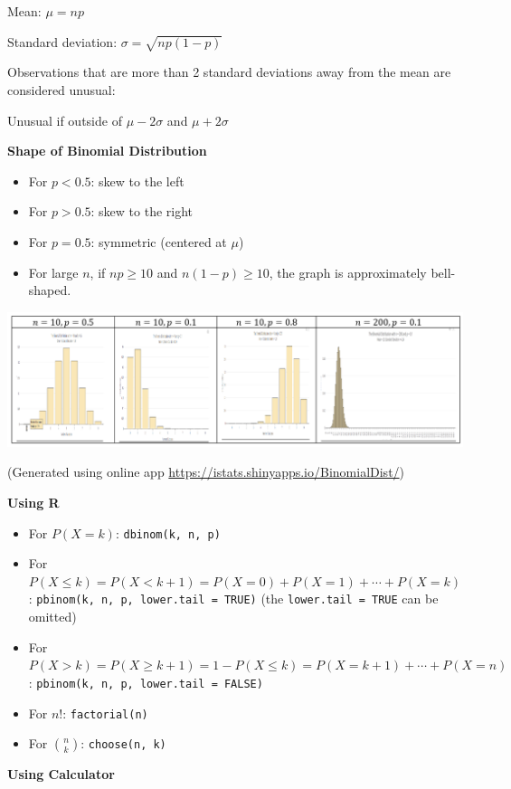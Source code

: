 \documentclass[
]{book}
\providecommand{\tightlist}{%
  \setlength{\itemsep}{0pt}\setlength{\parskip}{0pt}}
\begin{document}
Mean: \(\mu = np\)

Standard deviation: \(\sigma = \sqrt{np(1-p)}\)

Observations that are more than 2 standard deviations away from the mean are considered unusual:

Unusual if outside of \(\mu - 2\sigma\) and \(\mu + 2\sigma\)

\textbf{Shape of Binomial Distribution}

\begin{itemize}
\tightlist
\item
  For \(p < 0.5\): skew to the left
\item
  For \(p > 0.5\): skew to the right
\item
  For \(p = 0.5\): symmetric (centered at \(\mu\))
\item
  For large \(n\), if \(np \geq 10\) and \(n(1-p) \geq 10\), the graph is approximately bell-shaped.
\end{itemize}

\includegraphics[width=5.72917in,height=\textheight]{images/img41.png}

(Generated using online app \url{https://istats.shinyapps.io/BinomialDist/})

\textbf{Using R}

\begin{itemize}
\item
  For \(P(X = k)\): \texttt{dbinom(k,\ n,\ p)}
\item
  For \(P(X \leq k) = P(X < k+1) = P(X = 0) + P(X = 1) + \cdots + P(X = k)\): \texttt{pbinom(k,\ n,\ p,\ lower.tail\ =\ TRUE)} (the \texttt{lower.tail\ =\ TRUE} can be omitted)
\item
  For \(P(X > k) = P(X \geq k+1) = 1 - P(X \leq k) = P(X = k+1) + \cdots + P(X = n)\): \texttt{pbinom(k,\ n,\ p,\ lower.tail\ =\ FALSE)}
\item
  For \(n!\): \texttt{factorial(n)}
\item
  For \(\binom{n}{k}\): \texttt{choose(n,\ k)}
\end{itemize}

\textbf{Using Calculator}
\end{document}
